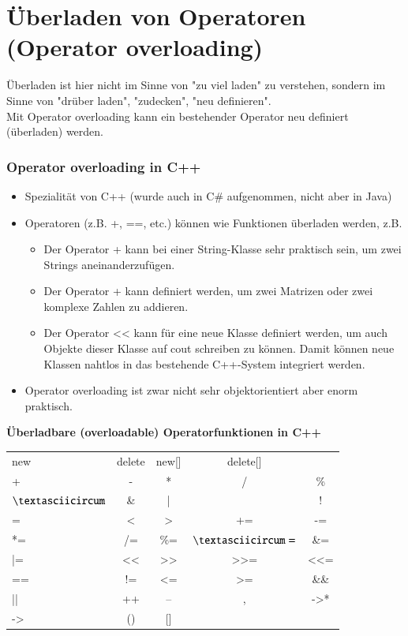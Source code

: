 
\part{Überladen von Operatoren (Operator overloading)}
\label{sec:operator overloading}
Überladen ist hier nicht im Sinne von "zu viel laden" zu verstehen, sondern im Sinne von "drüber laden", "zudecken", "neu definieren".\\
Mit Operator overloading kann ein bestehender Operator neu definiert (überladen) werden.

\section{Operator overloading in C++}
\begin{itemize}
	\item Spezialität von C++ (wurde auch in C\# aufgenommen, nicht aber in Java)
	\item Operatoren (z.B. +, ==, etc.) können wie Funktionen überladen werden, z.B.
	\begin{itemize}
		\item Der Operator + kann bei einer String-Klasse sehr praktisch sein, um zwei Strings aneinanderzufügen.
		\item Der Operator + kann definiert werden, um zwei Matrizen oder zwei komplexe Zahlen zu addieren.
		\item Der Operator << kann für eine neue Klasse definiert werden, um auch Objekte dieser Klasse auf cout schreiben zu können. Damit können neue Klassen nahtlos in das bestehende C++-System integriert werden.
	\end{itemize}
	\item Operator overloading ist zwar nicht sehr objektorientiert aber enorm praktisch.
\end{itemize}
\vspace{\baselineskip}
\textbf{Überladbare (overloadable) Operatorfunktionen in C++}\\
\vspace{\baselineskip}
\begin{tabular}{|l|c|c|c|c|}
	\hline 
	new & delete & new[] & delete[] &  \\ 
	+ & - & * & / & \% \\ 
	\hline 
	$\textasciicircum$ & \& & | & ~ & ! \\ 
	\hline 
	= & < & > & += & -= \\ 
	\hline 
	*= & /= & \%= & $\textasciicircum=$ & \&= \\ 
	\hline 
	|= & << & >> & >>= & <<= \\ 
	\hline 
	== & != & <= & >= & \&\& \\ 
	\hline 
	|| & ++ & -- & , & ->* \\ 
	\hline 
	-> & () & [] &  &  \\ 
	\hline 
\end{tabular}

